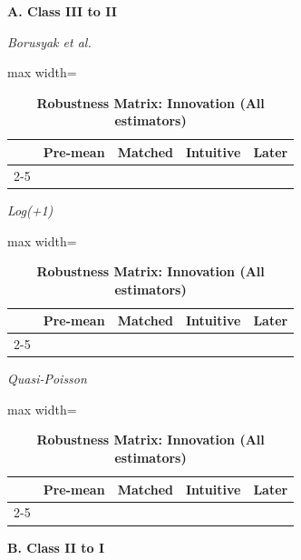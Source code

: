 \documentclass[letterpaper,12pt]{article}
\theoremstyle{definition}
\begin{document}
\begin{table}[t]
\centering
\caption{\textbf{Robustness Matrix: Innovation (All estimators)}}
\begin{threeparttable}

\noindent\makebox[\textwidth]{\rule{\textwidth}{0.5pt}}

\vspace{-13pt}

\noindent\makebox[\textwidth]{\rule{\textwidth}{0.5pt}}

\begin{minipage}[t]{0.49\textwidth}
\centering\footnotesize
\textbf{A. Class III to II}\par\vspace{4pt}

\emph{Borusyak et al.}\par
\begin{adjustbox}{max width=\linewidth}
\begin{tabular}{@{}lcccc@{}}
\toprule
 & Pre-mean & Matched & Intuitive & Later \\
\cmidrule(lr){2-5}

\bottomrule
\end{tabular}
\end{adjustbox}\vspace{6pt}

\emph{Log(+1)}\par
\begin{adjustbox}{max width=\linewidth}
\begin{tabular}{@{}lcccc@{}}
\toprule
 & Pre-mean & Matched & Intuitive & Later \\
\cmidrule(lr){2-5}

\bottomrule
\end{tabular}
\end{adjustbox}\vspace{6pt}

\emph{Quasi-Poisson}\par
\begin{adjustbox}{max width=\linewidth}
\begin{tabular}{@{}lcccc@{}}
\toprule
 & Pre-mean & Matched & Intuitive & Later \\
\cmidrule(lr){2-5}

\bottomrule
\end{tabular}
\end{adjustbox}
\end{minipage}\hfill
\begin{minipage}[t]{0.49\textwidth}
\centering\footnotesize
\textbf{B. Class II to I}\par\vspace{4pt}


\end{minipage}
\end{threeparttable}
\end{table}
\end{document}
